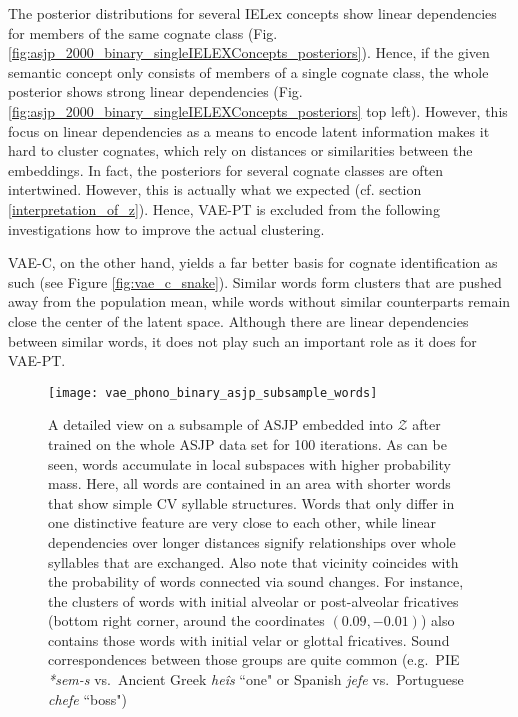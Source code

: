 \documentclass[6pt]{article}
\begin{document}
The posterior distributions for several IELex concepts show linear dependencies for members of the same cognate class (Fig. \ref{fig:asjp_2000_binary_singleIELEXConcepts_posteriors}). Hence, if the given semantic concept only consists of members of a single cognate class, the whole posterior shows strong linear dependencies (Fig. \ref{fig:asjp_2000_binary_singleIELEXConcepts_posteriors} top left). However, this focus on linear dependencies as a means to encode latent information makes it hard to cluster cognates, which rely on distances or similarities between the embeddings. In fact, the posteriors for several cognate classes are often intertwined. However, this is actually what we expected (cf. section \ref{interpretation_of_z}). Hence, VAE-PT is excluded from the following investigations how to improve the actual clustering.


VAE-C, on the other hand, yields a far better basis for cognate identification as such (see Figure \ref{fig:vae_c_snake}). Similar words form clusters that are pushed away from the population mean, while words without similar counterparts remain close the center of the latent space. Although there are linear dependencies between similar words, it does not play such an important role as it does for VAE-PT.  
\begin{figure}[h!] %
   \centering
   \texttt{[image: vae\_phono\_binary\_asjp\_subsample\_words]} 
   \caption{A detailed view on a subsample of ASJP embedded into $\mathcal{Z}$ after trained on the whole ASJP data set for 100 iterations. As can be seen, words accumulate in local subspaces with higher probability mass. Here, all words are contained in an area with shorter words that show simple CV syllable structures. Words that only differ in one distinctive feature are very close to each other, while linear dependencies over longer distances signify relationships over whole syllables that are exchanged. Also note that vicinity coincides with the probability of words connected via sound changes. For instance, the clusters of words with initial alveolar or post-alveolar fricatives (bottom right corner, around the coordinates $(0.09,-0.01)$) also contains those words with initial velar or glottal fricatives. Sound correspondences between those groups are quite common (e.g.~PIE \textit{*sem-s} vs.~Ancient Greek \textit{heîs} ``one" or  Spanish \textit{jefe} vs.~Portuguese \textit{chefe} ``boss") }
   \label{fig:vae_phono_binary_asjp_subsample_words}
\end{figure}
\end{document}
